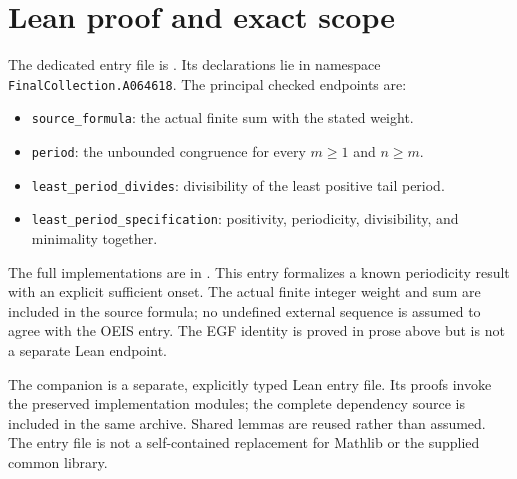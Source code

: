 \documentclass[11pt,a4paper]{article}
\theoremstyle{remark}
\begin{document}
\section{Lean proof and exact scope}
The dedicated entry file is . Its declarations lie in namespace \texttt{FinalCollection.A064618}. The principal checked endpoints are:
\begin{itemize}[nosep]
\item \texttt{source\_formula}: the actual finite sum with the stated weight.
\item \texttt{period}: the unbounded congruence for every $m\ge1$ and $n\ge m$.
\item \texttt{least\_period\_divides}: divisibility of the least positive tail period.
\item \texttt{least\_period\_specification}: positivity, periodicity, divisibility, and minimality together.
\end{itemize}
The full implementations are in .
This entry formalizes a known periodicity result with an explicit sufficient onset. The actual finite integer weight and sum are included in the source formula; no undefined external sequence is assumed to agree with the OEIS entry. The EGF identity is proved in prose above but is not a separate Lean endpoint. 

The companion is a separate, explicitly typed Lean entry file. Its proofs
invoke the preserved implementation modules; the complete dependency source
is included in the same archive. Shared lemmas are reused rather than
assumed. The entry file is not a self-contained replacement for Mathlib or
the supplied common library.
\end{document}
